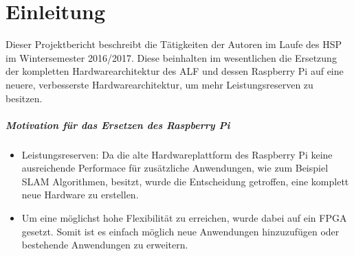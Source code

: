\chapter{Einleitung}
Dieser Projektbericht beschreibt die Tätigkeiten der Autoren im Laufe des 
\ac{HSP} im Wintersemester 2016/2017. Diese beinhalten im wesentlichen 
die Ersetzung der kompletten Hardwarearchitektur des ALF und dessen Raspberry Pi 
auf eine neuere, verbesserste Hardwarearchitektur, um mehr Leistungsreserven zu 
besitzen.

\paragraph{Motivation für das Ersetzen des Raspberry Pi} 
\begin{itemize}
 \item Leistungsreserven: Da die alte Hardwareplattform des Raspberry Pi keine ausreichende Performace für zusätzliche Anwendungen, wie zum Beispiel SLAM Algorithmen, besitzt, wurde die Entscheidung getroffen, eine komplett neue Hardware zu erstellen.
\item Um eine möglichst hohe Flexibilität zu erreichen, wurde dabei auf ein FPGA gesetzt. Somit ist es einfach möglich neue Anwendungen hinzuzufügen oder bestehende Anwendungen zu erweitern.
\end{itemize}

